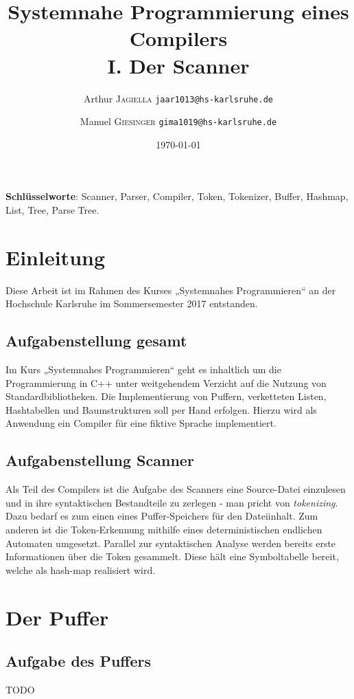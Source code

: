 \documentclass[
a4paper,   %
11pt,      %
oneside,   %
onecolumn, %
final      %
]{article}
\title{Systemnahe Programmierung eines Compilers\\I. Der Scanner}
\author{Arthur \textsc{Jagiella} \hspace{1cm} \texttt{jaar1013@hs-karlsruhe.de} \and Manuel \textsc{Giesinger} \hspace{1cm} \texttt{gima1019@hs-karlsruhe.de}}
\date{\today}
\begin{document}
\maketitle



\textbf{Schlüsselworte}: Scanner, Parser, Compiler, Token, Tokenizer, Buffer, Hashmap, List, Tree, Parse Tree.


\section{Einleitung} %
Diese Arbeit ist im Rahmen des Kurses „Systemnahes Programmieren“ an der Hochschule Karlsruhe im Sommersemester 2017 entstanden. 

\subsection{Aufgabenstellung gesamt}
Im Kurs „Systemnahes Programmieren“ geht es inhaltlich um die Programmierung in C++ unter weitgehendem Verzicht auf die Nutzung von Standardbibliotheken. Die Implementierung von Puffern, verketteten Listen, Hashtabellen und Baumstrukturen soll per Hand erfolgen. Hierzu wird als Anwendung ein Compiler für eine fiktive Sprache implementiert.

\subsection{Aufgabenstellung Scanner} 
Als Teil des Compilers ist die Aufgabe des Scanners eine Source-Datei einzulesen und in ihre syntaktischen Bestandteile zu zerlegen - man pricht von \emph{tokenizing}. Dazu bedarf es zum einen eines Puffer-Speichers für den Dateiinhalt. Zum anderen ist die Token-Erkennung mithilfe eines deterministischen endlichen Automaten umgesetzt.
Parallel zur syntaktischen Analyse werden bereits erste Informationen über die Token gesammelt. Diese hält eine Symboltabelle bereit, welche als hash-map realisiert wird.


\section{Der Puffer}

\subsection{Aufgabe des Puffers}
TODO
\end{document}
